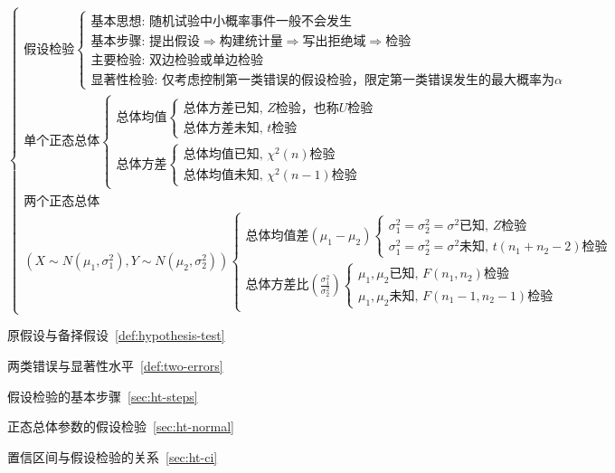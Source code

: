 ﻿\documentclass[lang=cn,11pt]{elegantbook}
\begin{document}
{\small
\[
\begin{cases}
\text{假设检验}
\begin{cases}
\text{基本思想: 随机试验中小概率事件一般不会发生} \\
\text{基本步骤: 提出假设} \Rightarrow \text{构建统计量} \Rightarrow \text{写出拒绝域} \Rightarrow \text{检验} \\
\text{主要检验: 双边检验或单边检验} \\
\text{显著性检验: 仅考虑控制第一类错误的假设检验，限定第一类错误发生的最大概率为} \alpha
\end{cases} \\
\text{单个正态总体}
\begin{cases}
\text{总体均值}
\begin{cases}
\text{总体方差已知, } Z\text{检验，也称} U\text{检验} \\
\text{总体方差未知, } t\text{检验}
\end{cases} \\
\text{总体方差}
\begin{cases}
\text{总体均值已知, } \chi^2(n)\text{检验} \\
\text{总体均值未知, } \chi^2(n-1)\text{检验}
\end{cases}
\end{cases} \\
\text{两个正态总体} \\
(X \sim N(\mu_1,\sigma_1^2), Y \sim N(\mu_2,\sigma_2^2))
\begin{cases}
\text{总体均值差} (\mu_1-\mu_2)
\begin{cases}
\sigma_1^2=\sigma_2^2=\sigma^2\text{已知, } Z\text{检验} \\
\sigma_1^2=\sigma_2^2=\sigma^2\text{未知, } t(n_1+n_2-2)\text{检验}
\end{cases} \\
\text{总体方差比} \left( \frac{\sigma_1^2}{\sigma_2^2} \right)
\begin{cases}
\mu_1,\mu_2\text{已知, } F(n_1,n_2)\text{检验} \\
\mu_1,\mu_2\text{未知, } F(n_1-1,n_2-1)\text{检验}
\end{cases}
\end{cases}
\end{cases}
\]
}

\begin{introduction}
    \item 原假设与备择假设~\ref{def:hypothesis-test}
    \item 两类错误与显著性水平~\ref{def:two-errors}
    \item 假设检验的基本步骤~\ref{sec:ht-steps}
    \item 正态总体参数的假设检验~\ref{sec:ht-normal}
    \item 置信区间与假设检验的关系~\ref{sec:ht-ci}
\end{introduction}
\end{document}
